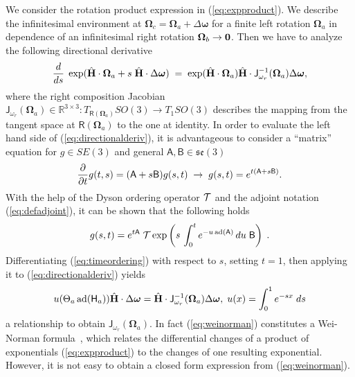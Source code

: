 \documentclass[journal]{IEEEtran}
\newcommand{\real}{\mathbb{R}}
\newcommand{\bfomega}{\boldsymbol{\omega}}
\newcommand{\bfOmega}{\boldsymbol{\Omega}}
\newcommand{\adj}[1]{\mathrm{ad}({#1})}
\newcommand{\beq}{\begin{equation}}
\newcommand{\eeq}{\end{equation}}
\begin{document}
We consider the rotation product expression in (\ref{eq:expproduct}). We
describe the infinitesimal environment at $\bfOmega_c = \bfOmega_a + \Delta\bfomega$
for a finite left rotation $\bfOmega_a$ in dependence of an infinitesimal right rotation $\bfOmega_b \rightarrow \bf 0$.
Then we have to analyze the following directional derivative
\beq
    {d\over ds}\;\exp(\hat{\bf H}\cdot\bfOmega_a + s\;\hat{\bf H}\cdot\Delta\bfomega)
    \; = \; \exp(\hat{\bf H}\cdot\bfOmega_a) \hat{\bf H}\cdot\mathsf{J}_{\omega_r}^{-1}(\bfOmega_a)
    \Delta\bfomega,
    \label{eq:directionalderiv}
\eeq
where the right composition Jacobian $\mathsf{J}_{\omega_r}(\bfOmega_a) \in \real^{3\times3}: 
T_{\mathsf{R}(\bfOmega_a)}SO(3)\rightarrow T_1SO(3)$ describes the
mapping from the tangent space at $\mathsf{R}(\bfOmega_a)$ to the one at identity.
In order to evaluate the left hand side of (\ref{eq:directionalderiv}), it is advantageous to
consider a ``matrix'' equation for $g\in SE(3)$ and general $\mathsf{A},\mathsf{B}\in \mathfrak{se}(3)$
\beq
    {\partial \over \partial t}g(t,s) = (\mathsf{A} + s\mathsf{B})g(s,t)\; \rightarrow \;
    g(s,t) = e^{t (\mathsf{A}+s\mathsf{B})}. \label{eq:SE3diff}
\eeq
With the help of the Dyson ordering operator ${\cal T}$ 
and the adjoint notation (\ref{eq:defadjoint}), it can be shown that the following holds
\beq
    g(s,t) = e^{t \mathsf{A}} \; {\cal T}\exp\left( s\,
    \int_0^t e^{-u\, \adj{\mathsf{A}}} \, du \; \mathsf{B} \right ) \; .
    \label{eq:timeordering}
\eeq
Differentiating (\ref{eq:timeordering}) with respect to $s$, setting $t=1$,
then applying it to (\ref{eq:directionalderiv}) yields
\beq
    u(\Theta_a\, \adj{\mathsf{H}_a} )
    \hat{\bf H}\cdot\Delta\bfomega = \hat{\bf H}\cdot \mathsf{J}_{\omega_r}^{-1}(\bfOmega_a)
    \Delta\bfomega,\; u(x)=\int_0^1 e^{-s x} \; ds
    \label{eq:weinorman}
\eeq
a relationship to obtain $\mathsf{J}_{\omega_r}(\bfOmega_a)$. In fact (\ref{eq:weinorman}) constitutes a
Wei-Norman formula~\cite{Wei-Norman}, which relates the differential changes of a product of
exponentials (\ref{eq:expproduct}) to the changes of one resulting exponential. However, it is not easy
to obtain a closed form expression from (\ref{eq:weinorman}).
\end{document}
